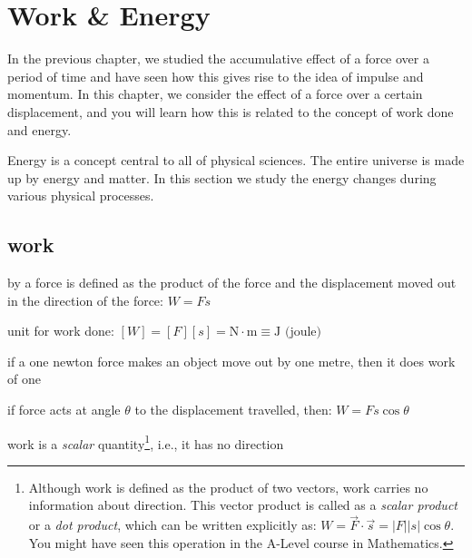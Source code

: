 \section{Work \& Energy}

In the previous chapter, we studied the accumulative effect of a force over a period of time and have seen how this gives rise to the idea of impulse and momentum. In this chapter, we consider the effect of a force over a certain displacement, and you will learn how this is related to the concept of work done and energy.

Energy is a concept central to all of physical sciences. The entire universe is made up by energy and matter. In this section we study the energy changes during various physical processes.

\subsection{work}

\begin{ilight}
	 by a force is defined as the product of the force and the displacement moved out in the direction of the force: $\boxed{W=Fs}$ 
\end{ilight}

\cmt unit for work done: $[W]=[F][s]=\text{N}\cdot\text{m}\equiv \text{J (joule)}$

if a one newton force makes an object move out by one metre, then it does work of one 

\cmt if force acts at angle $\theta$ to the displacement travelled, then: $\boxed{W=Fs\cos\theta} $

\begin{figure}[ht]
	\centering
\end{figure}

\cmt work is a \emph{scalar} quantity\footnote{Although work is defined as the product of two vectors, work carries no information about direction. This vector product is called as a \emph{scalar product} or a \emph{dot product}, which can be written explicitly as: $W = \vec{F} \cdot \vec{s} = |F||s|\cos\theta$. You might have seen this operation in the A-Level course in Mathematics.}, i.e., it has no direction


